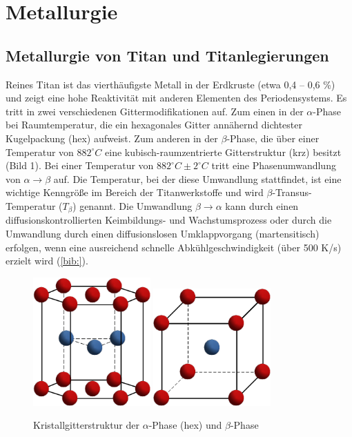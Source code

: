 \chapter{Metallurgie}	


\section{Metallurgie von Titan und Titanlegierungen}
Reines Titan ist das vierthäufigste Metall in der Erdkruste (etwa 0,4 -- 0,6 \%) und zeigt eine hohe Reaktivität mit anderen Elementen des Periodensystems. Es tritt in zwei verschiedenen Gittermodifikationen auf. Zum einen in der $\alpha$-Phase bei Raumtemperatur, die ein hexagonales Gitter annähernd dichtester Kugelpackung (hex) aufweist. Zum anderen in der $\beta$-Phase, die über einer Temperatur von $882 ^\circ C$ eine kubisch-raumzentrierte Gitterstruktur (krz) besitzt (Bild 1). Bei einer Temperatur von $882^\circ C \pm 2 ^\circ C$ tritt eine Phasenumwandlung von $\alpha \rightarrow \beta$ auf. Die Temperatur, bei der diese Umwandlung stattfindet, ist eine wichtige Kenngröße im Bereich der Titanwerkstoffe und wird $\beta$-Transus-Temperatur ($T_{\beta}$) genannt.
Die Umwandlung $\beta \rightarrow \alpha$ kann durch einen diffusionskontrollierten Keimbildungs- und Wachstumsprozess oder durch die Umwandlung durch einen diffusionslosen Umklappvorgang (martensitisch) erfolgen, wenn eine ausreichend schnelle Abkühlgeschwindigkeit (über 500 K/s) erzielt wird (\ref{bib:}).

\begin{figure}
	\centering
	\subfloat{}
	\includegraphics[width=0.4\textwidth]{Bilder/hcp}
	\hspace{2ex}
	\subfloat{}
	\includegraphics[width=0.4\textwidth]{Bilder/krz}
	\caption{Kristallgitterstruktur der $\alpha$-Phase (hex) und $\beta$-Phase}
	\label{fig:Kristallgitter}
\end{figure}


